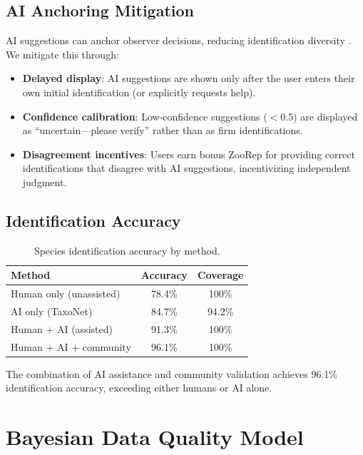 \documentclass[11pt,a4paper]{article}
\begin{document}
\subsection{AI Anchoring Mitigation}

AI suggestions can anchor observer decisions, reducing identification
diversity \citep{terry2020think}. We mitigate this through:

\begin{itemize}
  \item \textbf{Delayed display}: AI suggestions are shown only after
    the user enters their own initial identification (or explicitly
    requests help).
  \item \textbf{Confidence calibration}: Low-confidence suggestions
    ($<$0.5) are displayed as ``uncertain---please verify'' rather than
    as firm identifications.
  \item \textbf{Disagreement incentives}: Users earn bonus ZooRep for
    providing correct identifications that disagree with AI suggestions,
    incentivizing independent judgment.
\end{itemize}

\subsection{Identification Accuracy}

\begin{table}[H]
\centering
\caption{Species identification accuracy by method.}
\label{tab:id_accuracy}
\begin{tabular}{lcc}
\toprule
\textbf{Method} & \textbf{Accuracy} & \textbf{Coverage} \\
\midrule
Human only (unassisted) & 78.4\% & 100\% \\
AI only (TaxoNet) & 84.7\% & 94.2\% \\
Human + AI (assisted) & 91.3\% & 100\% \\
Human + AI + community & 96.1\% & 100\% \\
\bottomrule
\end{tabular}
\end{table}

The combination of AI assistance and community validation achieves
96.1\% identification accuracy, exceeding either humans or AI alone.


\section{Bayesian Data Quality Model}
\label{sec:quality}
\end{document}

